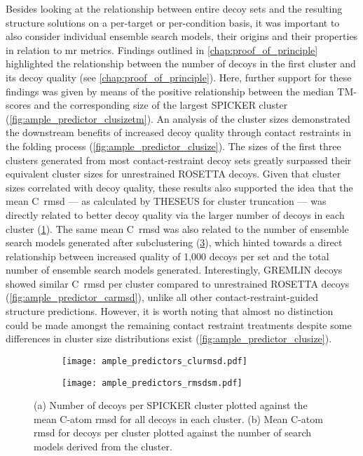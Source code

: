 Besides looking at the relationship between entire decoy sets and the resulting structure solutions on a per-target or per-condition basis, it was important to also consider individual ensemble search models, their origins and their properties in relation to \gls{mr} metrics. Findings outlined in \cref{chap:proof_of_principle} highlighted the relationship between the number of decoys in the first cluster and its decoy quality (see \cref{chap:proof_of_principle}). Here, further support for these findings was given by means of the positive relationship between the median TM-scores and the corresponding size of the largest SPICKER cluster (\cref{fig:ample_predictor_clusizetm}). An analysis of the cluster sizes demonstrated the downstream benefits of increased decoy quality through contact restraints in the folding process (\cref{fig:ample_predictor_clusize}). The sizes of the first three clusters generated from most contact-restraint decoy sets greatly surpassed their equivalent cluster sizes for unrestrained ROSETTA decoys. Given that cluster sizes correlated with decoy quality, these results also supported the idea that the mean C\textalpha\ \gls{rmsd} --- as calculated by THESEUS for cluster truncation --- was directly related to better decoy quality via the larger number of decoys in each cluster (\cref{fig:ample_predictor_clurmsd}). The same mean C\textalpha\ \gls{rmsd} was also related to the number of ensemble search models generated after subclustering (\cref{fig:ample_predictor_rmsdsm}), which hinted towards a direct relationship between increased quality of 1,000 decoys per set and the total number of ensemble search models generated. Interestingly, GREMLIN decoys showed similar C\textalpha\ \gls{rmsd} per cluster compared to unrestrained ROSETTA decoys (\cref{fig:ample_predictor_carmsd}), unlike all other contact-restraint-guided structure predictions. However, it is worth noting that almost no distinction could be made amongst the remaining contact restraint treatments despite some differences in cluster size distributions exist (\cref{fig:ample_predictor_clusize}).

\begin{figure}[H]
    \centering
    \begin{subfigure}[b]{0.49\textwidth}
        \texttt{[image: ample\_predictors\_clurmsd.pdf]}
        \caption{}
        \label{fig:ample_predictor_clurmsd}
    \end{subfigure}
    \begin{subfigure}[b]{0.49\textwidth}
        \texttt{[image: ample\_predictors\_rmsdsm.pdf]}
        \caption{}
        \label{fig:ample_predictor_rmsdsm}
    \end{subfigure}

    \caption[SPICKER cluster properties]{(a) Number of decoys per SPICKER cluster plotted against the mean C\textalpha-atom \gls{rmsd} for all decoys in each cluster. (b) Mean C\textalpha-atom \gls{rmsd} for decoys per cluster plotted against the number of search models derived from the cluster.}
\end{figure}

